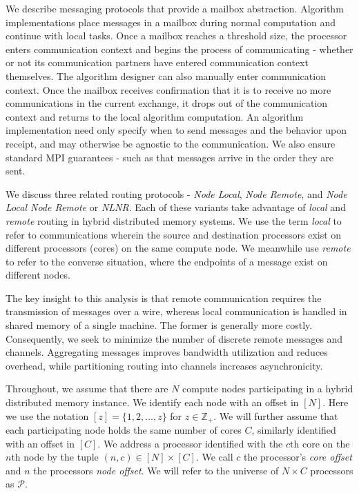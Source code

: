 \documentclass[10]{report}
\begin{document}
We describe messaging protocols that provide a mailbox abstraction.
Algorithm implementations place messages in a mailbox during normal computation and continue with local tasks. 
Once a mailbox reaches a threshold size, the processor enters communication context and begins the process of communicating - whether or not its communication partners have entered communication context themselves. 
The algorithm designer can also manually enter communication context.
Once the mailbox receives confirmation that it is to receive no more communications in the current exchange, it drops out of the communication context and returns to the local algorithm computation.
An algorithm implementation need only specify when to send messages and the behavior upon receipt, and may otherwise be agnostic to the communication.
We also ensure standard MPI guarantees - such as that messages arrive in the order they are sent. 

We discuss three related routing protocols - \emph{Node Local}, \emph{Node Remote}, and \emph{Node Local Node Remote} or \emph{NLNR}.
Each of these variants take advantage of \emph{local} and \emph{remote} routing in hybrid distributed memory systems. 
We use the term \emph{local} to refer to communications wherein the source and destination processors exist on different processors (cores) on the same compute node.
We meanwhile use \emph{remote} to refer to the converse situation, where the endpoints of a message exist on different nodes. 

The key insight to this analysis is that remote communication requires the transmission of messages over a wire, whereas local communication is handled in shared memory of a single machine. 
The former is generally more costly.
Consequently, we seek to minimize the number of discrete remote messages and channels.
Aggregating messages improves bandwidth utilization and reduces overhead, while  partitioning routing into channels increases asynchronicity. 

Throughout, we assume that there are $N$ compute nodes participating in a hybrid distributed memory instance.
We identify each node with an offset in $[N]$.
Here we use the notation $[z] = \{1, 2, \dots, z\}$ for $z \in \mathbb{Z}_+$.
We will further assume that each participating node holds the same number of cores $C$, similarly identified with an offset in $[C]$. 
We address a processor identified with the $c$th core on the $n$th node by the tuple $(n,c) \in [N] \times [C]$.
We call $c$ the processor's \emph{core offset} and $n$ the processors \emph{node offset}.
We will refer to the universe of $N \times C$ processors as $\mathcal{P}$.
\end{document}
